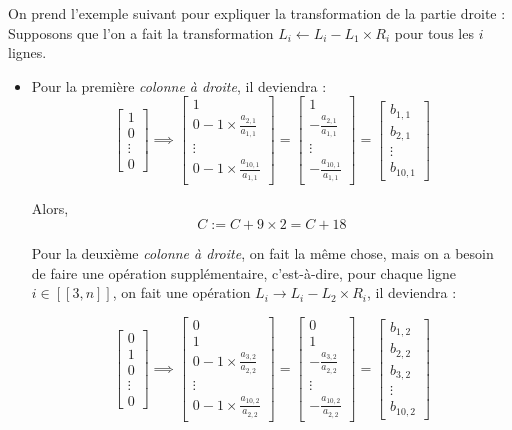 \documentclass{article}
\begin{document}
On prend l'exemple suivant pour expliquer la transformation de la partie droite : Supposons que l'on a fait la transformation $L_i \leftarrow L_i - L_1 \times R_i$ pour tous les $i$ lignes.
\begin{itemize}
    \item Pour la première \textit{colonne à droite},  il deviendra :
\[
\begin{bmatrix} 1 \\ 0 \\ \vdots \\ 0 \end{bmatrix} \implies
\begin{bmatrix}
 1\\
 0-1\times\frac{a_{2,1}}{a_{1,1}} \\
 \vdots\\
 0-1\times\frac{a_{10,1}}{a_{1,1}}
\end{bmatrix}=
\begin{bmatrix}
 1\\
 -\frac{a_{2,1}}{a_{1,1}} \\
 \vdots\\
-\frac{a_{10,1}}{a_{1,1}}
\end{bmatrix}=
\begin{bmatrix}
b_{1,1}\\
b_{2,1}\\
\vdots\\
b_{10,1}
\end{bmatrix}
\]

Alors, \[
C := C + 9 \times 2 = C + 18
\]

Pour la deuxième \textit{colonne à droite}, on fait la même chose, mais on a besoin de faire une opération supplémentaire, c'est-à-dire, pour chaque ligne $i \in [\![3, n]\!]$, on fait une opération $L_i \rightarrow L_i - L_2 \times R_i$, il deviendra :

\[
\begin{bmatrix} 0 \\ 1 \\ 0 \\ \vdots \\ 0 \end{bmatrix}  \implies
\begin{bmatrix}
 0\\
 1\\
 0-1\times\frac{a_{3,2}}{a_{2,2}} \\
 \vdots\\
 0-1\times\frac{a_{10,2}}{a_{2,2}}
\end{bmatrix}=
\begin{bmatrix}
 0\\
 1\\
 -\frac{a_{3,2}}{a_{2,2}} \\
 \vdots\\
-\frac{a_{10,2}}{a_{2,2}}
\end{bmatrix}=
\begin{bmatrix}
b_{1,2}\\
b_{2,2}\\
b_{3,2}\\
\vdots\\
b_{10,2}
\end{bmatrix}
\]


\end{itemize}
\end{document}

